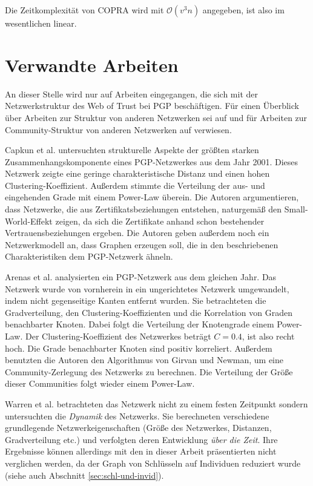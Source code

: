 Die Zeitkomplexität von COPRA wird mit $\mathcal{O}(v^3n)$
angegeben, ist also im wesentlichen linear.

\section{Verwandte Arbeiten}
\label{ch:Grundlagen:sec:RelatedWork}

An dieser Stelle wird nur auf Arbeiten eingegangen, die sich mit der
Netzwerkstruktur des Web of Trust bei PGP beschäftigen. Für einen
Überblick über Arbeiten zur Struktur von anderen Netzwerken sei
auf \cite{newman:167}und für Arbeiten zur Community-Struktur von
anderen Netzwerken auf \cite{Fortunato2010} verwiesen.

Capkun et al. \cite{Capkun2002} untersuchten strukturelle Aspekte der
größten starken Zusammenhangskomponente eines PGP-Netzwerkes aus
dem Jahr 2001. Dieses Netzwerk zeigte eine geringe charakteristische
Distanz und einen hohen Clustering-Koeffizient. Außerdem stimmte die
Verteilung der aus- und eingehenden Grade mit einem Power-Law
überein. Die Autoren argumentieren, dass Netzwerke, die aus
Zertifikatsbeziehungen entstehen, naturgemäß den Small-World-Effekt
zeigen, da sich die Zertifikate anhand schon bestehender
Vertrauensbeziehungen ergeben. Die Autoren geben außerdem noch ein
Netzwerkmodell an, dass Graphen erzeugen soll, die in den
beschriebenen Charakteristiken dem PGP-Netzwerk ähneln.

Arenas et al. \cite{Boguna2004} analysierten ein PGP-Netzwerk aus dem
gleichen Jahr. Das Netzwerk wurde von vornherein in ein ungerichtetes
Netzwerk umgewandelt, indem nicht gegenseitige Kanten entfernt
wurden. Sie betrachteten die Gradverteilung, den
Clustering-Koeffizienten und die Korrelation von Graden benachbarter
Knoten. Dabei folgt die Verteilung der Knotengrade einem
Power-Law. Der Clustering-Koeffizient des Netzwerkes beträgt $C=0.4$,
ist also recht hoch. Die Grade benachbarter Knoten sind positiv
korreliert. Außerdem benutzten die Autoren den Algorithmus von Girvan
und Newman\cite{Newman2004}, um eine Community-Zerlegung des Netzwerks
zu berechnen. Die Verteilung der Größe dieser Communities folgt wieder
einem Power-Law.

Warren et al. betrachteten das Netzwerk nicht zu einem festen
Zeitpunkt sondern untersuchten die \emph{Dynamik} des
Netzwerks\cite{Warren2007}. Sie berechneten verschiedene grundlegende
Netzwerkeigenschaften (Größe des Netzwerkes, Distanzen,
Gradverteilung etc.) und verfolgten deren Entwicklung \emph{über die
  Zeit}. Ihre Ergebnisse können allerdings mit den in dieser Arbeit
präsentierten nicht verglichen werden, da der Graph von Schlüsseln
auf Individuen reduziert wurde (siehe auch Abschnitt
\ref{sec:schl-und-invid}).

